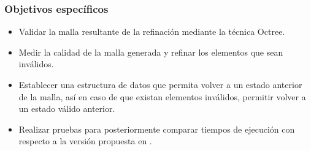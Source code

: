 \subsubsection{Objetivos específicos}
\begin{itemize}
    \item Validar la malla resultante de la refinación mediante la técnica Octree.
    \item Medir la calidad de la malla generada y refinar los elementos que sean inválidos.
    \item Establecer una estructura de datos que permita volver a un estado anterior de la malla, así en caso de que existan elementos inválidos, permitir volver a un estado válido anterior.
    \item Realizar pruebas para posteriormente comparar tiempos de ejecución con respecto a la versión propuesta en \cite{daines2018repairing}.
\end{itemize}



